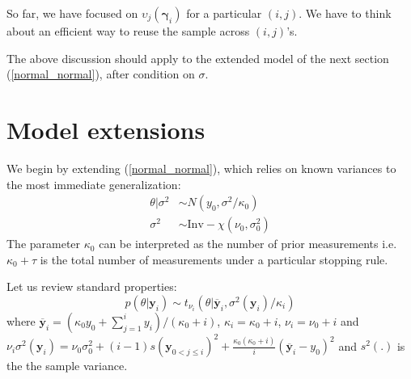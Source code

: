 \documentclass{article}
\begin{document}
So far, we have focused on $\upsilon_j(\boldsymbol{\gamma}_i)$ for a
particular $(i,j)$. We have to think about an efficient way to reuse
the sample across $(i,j)$'s.

The above discussion should apply to the extended model of the next
section (\ref{normal_normal}), after condition on $\sigma$.


\section{Model extensions}\label{sec:ext}
We begin by extending (\ref{normal_normal}), which relies on known
variances to the most immediate generalization:
\begin{align}\label{N_xi}
\theta|\sigma^2 &\sim N(y_0,\sigma^2/\kappa_0)\\
\sigma^2 &\sim \mathrm{Inv}-\chi(\nu_0,\sigma_0^2)
\end{align}The parameter $\kappa_0$ can be interpreted as the number of
prior measurements i.e. $\kappa_0+\tau$ is the total number of
measurements under a particular stopping rule.

Let us review standard properties:
\begin{equation}
p(\theta|\mathbf{y}_i)\sim
t_{\nu_i}(\theta|\overline{\mathbf{y}}_i,\sigma^2(\mathbf{y}_i)/\kappa_i)
\end{equation}where $\overline{\mathbf{y}}_i=(\kappa_0 y_0 +\sum_{j=1}^i
y_i)/(\kappa_0+i)$, $\kappa_i=\kappa_0+i$, $\nu_i=\nu_0+i$ and
$\nu_i\sigma^2(\mathbf{y}_i)=\nu_0\sigma_0^2+(i-1)s(\mathbf{y}_{0<j\leq
i})^2+\frac{\kappa_0(\kappa_0+i)}{i}(\overline{\mathbf{y}}_{i}-y_0)^2$
and $s^2(.)$ is the the sample variance.

\end{document}
